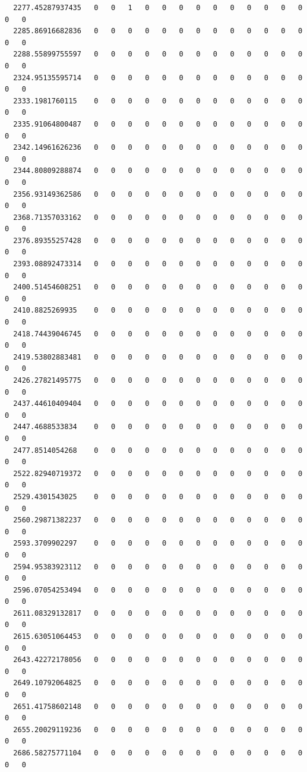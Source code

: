 \documentclass[
  letterpaper,
  DIV=11,
  numbers=noendperiod]{scrartcl}
\begin{document}
\begin{verbatim}
  2277.45287937435   0   0   1   0   0   0   0   0   0   0   0   0   0   0   0
  2285.86916682836   0   0   0   0   0   0   0   0   0   0   0   0   0   0   0
  2288.55899755597   0   0   0   0   0   0   0   0   0   0   0   0   0   0   0
  2324.95135595714   0   0   0   0   0   0   0   0   0   0   0   0   0   0   0
  2333.1981760115    0   0   0   0   0   0   0   0   0   0   0   0   0   0   0
  2335.91064800487   0   0   0   0   0   0   0   0   0   0   0   0   0   0   0
  2342.14961626236   0   0   0   0   0   0   0   0   0   0   0   0   0   0   0
  2344.80809288874   0   0   0   0   0   0   0   0   0   0   0   0   0   0   0
  2356.93149362586   0   0   0   0   0   0   0   0   0   0   0   0   0   0   0
  2368.71357033162   0   0   0   0   0   0   0   0   0   0   0   0   0   0   0
  2376.89355257428   0   0   0   0   0   0   0   0   0   0   0   0   0   0   0
  2393.08892473314   0   0   0   0   0   0   0   0   0   0   0   0   0   0   0
  2400.51454608251   0   0   0   0   0   0   0   0   0   0   0   0   0   0   0
  2410.8825269935    0   0   0   0   0   0   0   0   0   0   0   0   0   0   0
  2418.74439046745   0   0   0   0   0   0   0   0   0   0   0   0   0   0   0
  2419.53802883481   0   0   0   0   0   0   0   0   0   0   0   0   0   0   0
  2426.27821495775   0   0   0   0   0   0   0   0   0   0   0   0   0   0   0
  2437.44610409404   0   0   0   0   0   0   0   0   0   0   0   0   0   0   0
  2447.4688533834    0   0   0   0   0   0   0   0   0   0   0   0   0   0   0
  2477.8514054268    0   0   0   0   0   0   0   0   0   0   0   0   0   0   0
  2522.82940719372   0   0   0   0   0   0   0   0   0   0   0   0   0   0   0
  2529.4301543025    0   0   0   0   0   0   0   0   0   0   0   0   0   0   0
  2560.29871382237   0   0   0   0   0   0   0   0   0   0   0   0   0   0   0
  2593.3709902297    0   0   0   0   0   0   0   0   0   0   0   0   0   0   0
  2594.95383923112   0   0   0   0   0   0   0   0   0   0   0   0   0   0   0
  2596.07054253494   0   0   0   0   0   0   0   0   0   0   0   0   0   0   0
  2611.08329132817   0   0   0   0   0   0   0   0   0   0   0   0   0   0   0
  2615.63051064453   0   0   0   0   0   0   0   0   0   0   0   0   0   0   0
  2643.42272178056   0   0   0   0   0   0   0   0   0   0   0   0   0   0   0
  2649.10792064825   0   0   0   0   0   0   0   0   0   0   0   0   0   0   0
  2651.41758602148   0   0   0   0   0   0   0   0   0   0   0   0   0   0   0
  2655.20029119236   0   0   0   0   0   0   0   0   0   0   0   0   0   0   0
  2686.58275771104   0   0   0   0   0   0   0   0   0   0   0   0   0   0   0

\end{verbatim}
\end{document}
